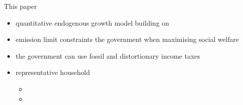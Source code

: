 \documentclass[11pt,aspectratio=169]{beamer}
\begin{document}
\begin{frame}{This paper}
	\begin{itemize}
		\item<+-> quantitative \alert{endogenous growth} model building on \cite{Fried2018ClimateAnalysis}
		\vspace{3mm}
		\item<+->  \alert{emission limit constraints} the government when  {maximising social welfare}
		\vspace{3mm}
		\item<+-> the government can use \alert{fossil} and \alert{distortionary income taxes}
		\vspace{3mm}
		\item<+->  \alert{representative} household %
		\vspace{2mm}
		\begin{itemize}
			\item[] %
			\vspace{1mm}
			\item[]%
		\end{itemize}
		
	\end{itemize}
\end{frame}
\addtocounter{framenumber}{-1}
\end{document}
